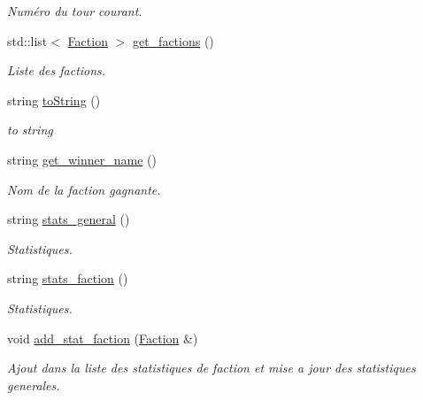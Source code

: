 \begin{DoxyCompactItemize}
\begin{DoxyCompactList}\small\item\em Numéro du tour courant. \end{DoxyCompactList}\item 
std\-::list$<$ \hyperlink{classFaction}{Faction} $>$ \hyperlink{classWorld_afcbc72644f2fc56f223c9bb80b50474a}{get\-\_\-factions} ()
\begin{DoxyCompactList}\small\item\em Liste des factions. \end{DoxyCompactList}\item 
string \hyperlink{classWorld_a8d508e1ca0f3df8c505e298d73b25e7f}{to\-String} ()
\begin{DoxyCompactList}\small\item\em to string \end{DoxyCompactList}\item 
string \hyperlink{classWorld_aaa59a538a6b688f164707743faf63072}{get\-\_\-winner\-\_\-name} ()
\begin{DoxyCompactList}\small\item\em Nom de la faction gagnante. \end{DoxyCompactList}\item 
string \hyperlink{classWorld_a7fa25049914905529f05bcf3a6ef3edf}{stats\-\_\-general} ()
\begin{DoxyCompactList}\small\item\em Statistiques. \end{DoxyCompactList}\item 
string \hyperlink{classWorld_a0c5b67d67eb8d92607293423cbbe4f2b}{stats\-\_\-faction} ()
\begin{DoxyCompactList}\small\item\em Statistiques. \end{DoxyCompactList}\item 
void \hyperlink{classWorld_a362764854326909e01a367780e71d7c3}{add\-\_\-stat\-\_\-faction} (\hyperlink{classFaction}{Faction} \&)
\begin{DoxyCompactList}\small\item\em Ajout dans la liste des statistiques de faction et mise a jour des statistiques generales. \end{DoxyCompactList}\end{DoxyCompactItemize}
